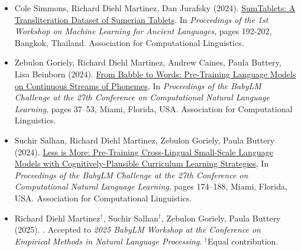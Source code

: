 \begin{tcolorbox}
\begin{itemize}
    \item Cole Simmons, Richard Diehl Martinez, Dan Jurafsky (2024). {\color{thesisblue}\href{https://aclanthology.org/2024.ml4al-1.20/}{SumTablets: A Transliteration Dataset of Sumerian Tablets}}. In \emph{Proceedings of the 1st Workshop on Machine Learning for Ancient Languages}, pages 192-202, Bangkok, Thailand. Association for Computational Linguistics.
    \item Zebulon Goriely, Richard Diehl Martinez, Andrew Caines, Paula Buttery, Lisa Beinborn (2024). {\color{thesisblue}\href{https://aclanthology.org/2024.conll-babylm.4/}{From Babble to Words: Pre-Training Language Models on Continuous Streams of Phonemes}}, In \emph{Proceedings of the BabyLM Challenge at the 27th Conference on Computational Natural Language Learning}, pages 37--53, Miami, Florida, USA. Association for Computational Linguistics.
    \item Suchir Salhan, Richard Diehl Martinez, Zebulon Goriely, Paula Buttery (2024). {\color{thesisblue}\href{https://aclanthology.org/2024.conll-babylm.15/}{Less is More: Pre-Training Cross-Lingual Small-Scale Language Models with Cognitively-Plausible Curriculum Learning Strategies}}, In \emph{Proceedings of the BabyLM Challenge at the 27th Conference on Computational Natural Language Learning}, pages 174--188, Miami, Florida, USA. Association for Computational Linguistics.
    \item  Richard Diehl Martinez$^{\dagger}$, Suchir Salhan$^{\dagger}$, Zebulon Goriely, Paula Buttery (2025). {}. Accepted to \emph{2025 BabyLM Workshop at the Conference on Empirical Methods in Natural Language Processing}. $^{\dagger}$Equal contribution.
\end{itemize}
\end{tcolorbox}